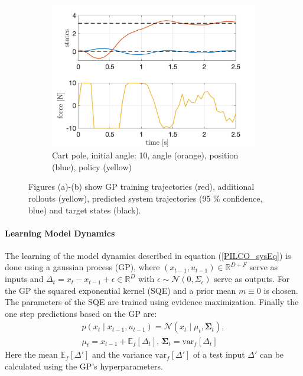 \documentclass[letterpaper, 10 pt, conference]{ieeeconf}  %
\begin{document}
\begin{figure}[!thp]
\begin{subfigure}{0.325\textwidth}
	\includegraphics[width=\textwidth]{cp_quad.png}
	\caption{Cart pole, initial angle: 10\textdegree, angle (orange), position (blue), policy (yellow)}\label{fig:PILCO_cp}
	\end{subfigure}\caption{Figures (a)-(b) show GP training trajectories (red), additional rollouts (yellow), predicted system trajectories (95 \% confidence, blue) and target states (black).}\label{fig:PILCO}
\end{figure} 
\paragraph{Learning Model Dynamics}
The learning of the model dynamics described in equation (\ref{PILCO_sysEq}) is done using a gaussian process (GP), where $\left(x_{t-1},u_{t-1}\right) \in \mathbb{R}^{D+F}$ serve as inputs and $\Delta_t = x_{t} - x_{t-1} + \epsilon \in \mathbb{R}^D$ with $\epsilon \sim \mathcal{N}\left(0,\Sigma_\epsilon\right)$ serve as outputs. For the GP the squared exponential kernel (SQE) and a prior mean $m\equiv 0$ is chosen. The parameters of the SQE %
are trained using evidence maximization. Finally the one step predictions based on the GP are:
\begin{align}
p(x_t\mid x_{t-1}, u_{t-1}) = \mathcal{N} \left(x_t \mid \mu_t, \mathbf{\Sigma}_t \right),\label{PILCO_GPp}\\
\mu_t = x_{t-1} + \mathbb{E}_f \left[ \Delta_t \right],\, \mathbf{\Sigma}_t = \text{var}_f \left[ \Delta_t \right]\label{PILCO_GPmu_sigma}
\end{align}
Here the mean $\mathbb{E}_f\left[\Delta'\right]$ and the variance $\text{var}_f\left[\Delta'\right]$ of a test input $\Delta'$ can be calculated using the GP's hyperparameters\cite{PILCO_paper}.
\end{document}
